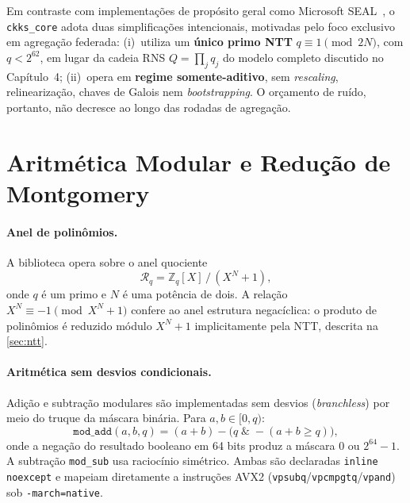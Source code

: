 \documentclass[11pt,a4paper]{article}
\newcommand{\Rq}{\mathcal{R}_q}
\begin{document}
Em contraste com implementações de propósito geral como Microsoft
SEAL~\cite{sealmanual}, o \texttt{ckks\_core} adota duas simplificações intencionais,
motivadas pelo foco exclusivo em agregação federada: (i)~utiliza um \textbf{único primo
NTT} $q \equiv 1 \pmod{2N}$, com $q < 2^{62}$, em lugar da cadeia RNS
$Q = \prod_j q_j$ do modelo completo discutido no Capítulo~4; (ii)~opera em
\textbf{regime somente-aditivo}, sem \emph{rescaling}, relinearização, chaves de Galois
nem \emph{bootstrapping}. O orçamento de ruído, portanto, não decresce ao longo das
rodadas de agregação.

\section{Aritmética Modular e Redução de Montgomery}
\label{sec:arithmetic}

\paragraph{Anel de polinômios.}
A biblioteca opera sobre o anel quociente
\begin{equation}
  \Rq = \mathbb{Z}_q[X]\,/\,(X^N+1),
  \label{eq:ring}
\end{equation}
onde $q$ é um primo e $N$ é uma potência de dois. A relação $X^N \equiv -1
\pmod{X^N+1}$ confere ao anel estrutura negacíclica: o produto de polinômios é
reduzido módulo $X^N+1$ implicitamente pela NTT, descrita na \cref{sec:ntt}.

\paragraph{Aritmética sem desvios condicionais.}
Adição e subtração modulares são implementadas sem desvios (\emph{branchless})
por meio do truque da máscara binária. Para $a, b \in [0,q)$:
\[
  \texttt{mod\_add}(a,b,q) = (a+b) - \bigl(q \;\mathbin{\&}\; -(a+b \geq q)\bigr),
\]
onde a negação do resultado booleano em 64 bits produz a máscara $0$ ou
$2^{64}-1$. A subtração \texttt{mod\_sub} usa raciocínio simétrico. Ambas são
declaradas \texttt{inline noexcept} e mapeiam diretamente a instruções AVX2
(\texttt{vpsubq}/\texttt{vpcmpgtq}/\texttt{vpand}) sob \texttt{-march=native}.
\end{document}

